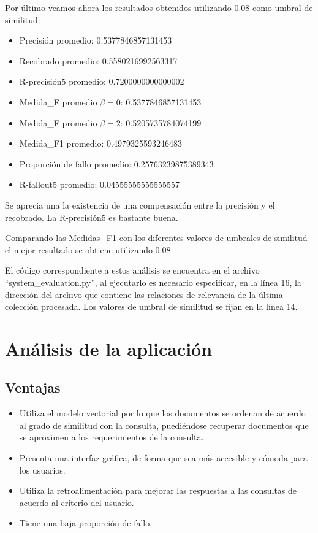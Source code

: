 \documentclass[runningheads]{llncs}
\begin{document}
Por \'ultimo veamos ahora los resultados obtenidos utilizando 0.08 como umbral de similitud:

\begin{itemize}
	\item Precisi\'on promedio:  0.5377846857131453
	\item Recobrado promedio:  0.5580216992563317
	\item R-precisi\'on5 promedio:  0.7200000000000002
	\item Medida\_F promedio  $ \beta=0 $:     0.5377846857131453
	\item Medida\_F promedio  $ \beta=2 $:   0.5205735784074199
	\item Medida\_F1 promedio:    0.4979325593246483
	\item Proporción de fallo promedio: 0.25763239875389343
	\item R-fallout5 promedio:  0.04555555555555557
\end{itemize}

Se aprecia una la existencia de una compensaci\'on entre la precisi\'on y el recobrado. La R-precisi\'on5 es bastante buena.

Comparando las Medidas\_F1 con los diferentes valores de umbrales de similitud el mejor resultado se obtiene utilizando 0.08.

El c\'odigo correspondiente a estos an\'alisis se encuentra en el archivo ``system\_evaluation.py'', al ejecutarlo es necesario especificar, en la l\'inea 16, la direcci\'on del archivo que contiene las relaciones de relevancia de la \'ultima colecci\'on procesada. Los valores de umbral de similitud se fijan en la l\'inea 14.



\section{An\'alisis de la aplicaci\'on}
\subsection{Ventajas}
\begin{itemize}
\item Utiliza el modelo vectorial por lo que los documentos se ordenan de acuerdo al grado de similitud con la consulta, puedi\'endose recuperar documentos que se aproximen a los requerimientos de la consulta.
\item Presenta una interfaz gr\'afica, de forma que sea m\'as accesible y c\'omoda para los usuarios.
\item Utiliza la retroalimentaci\'on para mejorar las respuestas a las consultas de acuerdo al criterio del usuario.
\item Tiene una baja proporci\'on de fallo.
\end{itemize}
\end{document}
